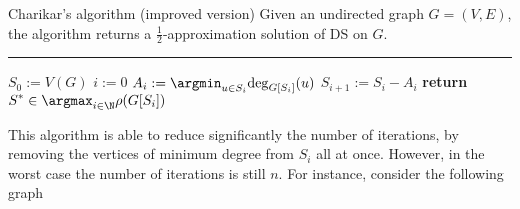 \documentclass[a4paper, 12pt]{report}
\begin{document}
    \begin{framedalgo}{Charikar's algorithm (improved version)}
        Given an undirected graph $G = (V, E)$, the algorithm returns a $\tfrac{1}{2}$-approximation solution of DS on $G$. \\
        \hrule

        \quad
        \begin{algorithmic}[1]
                \State $S_0 := V(G)$
                \State $i := 0$
                    \State $\displaystyle A_i := \argmin_{u \in S_i}{\deg_{G[S_i]}(u)}$
                    \State $S_{i + 1} := S_i - A_i$
                \EndWhile
                \State \textbf{return} $\displaystyle S^* \in \argmax_{i \in \N}{\rho(G[S_i])}$
            \EndFunction
        \end{algorithmic}
    \end{framedalgo}

    This algorithm is able to reduce significantly the number of iterations, by removing the vertices of minimum degree from $S_i$ all at once. However, in the worst case the number of iterations is still $n$. For instance, consider the following graph 

    \begin{figure}[H]
        \centering
    \end{figure}
\end{document}
